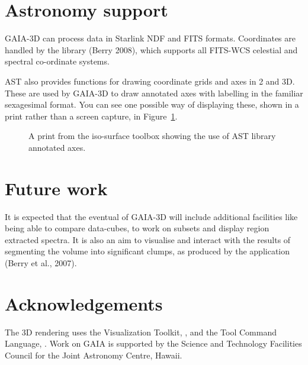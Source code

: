 \documentclass[11pt,twoside]{article}  %
\begin{document}
\section {Astronomy support}
GAIA-3D can process data in Starlink NDF and FITS formats. Coordinates are
handled by the  library
(Berry 2008), which supports all FITS-WCS celestial and spectral co-ordinate
systems. 

AST also provides functions for drawing coordinate grids and axes in 2 and
3D. These are used by GAIA-3D to draw annotated axes with labelling in the
familiar sexagesimal format. You can see one possible way of displaying these,
shown in a print rather than a screen capture, in Figure~\ref{P2.7-fig4}.

\begin{figure}
\caption{A print from the iso-surface toolbox showing the use of 
AST library annotated axes.}
\label{P2.7-fig4}
\end{figure}

\section{Future work}
It is expected that the eventual
 of GAIA-3D will
include additional facilities like being able to compare data-cubes, to work on
subsets and display region extracted spectra. It is also an aim to visualise
and interact with the results of segmenting the volume into significant
clumps, as produced by the
 application
(Berry et al., 2007).

\section{Acknowledgements}
The 3D rendering uses the Visualization Toolkit,
, and the Tool Command Language,
. Work on GAIA is supported by the
Science and Technology Facilities Council for the Joint Astronomy Centre,
Hawaii.
\end{document}
